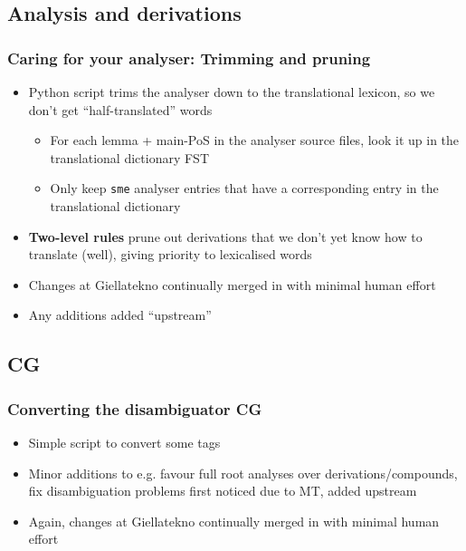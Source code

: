 \documentclass[notes=hide]{beamer}
\newcommand{\sme}{{\tt sme}}
\begin{document}
\subsection{Analysis and derivations}
\begin{frame}\frametitle{Caring for your analyser: Trimming and pruning}
  \begin{itemize}
  \item Python script trims the analyser down to the translational
    lexicon, so we don't get ``half-translated'' words
    \begin{itemize}
    \item For each lemma + main-PoS in the analyser source files, look
      it up in the translational dictionary FST
    \item Only keep \sme{} analyser entries that have a corresponding
      entry in the translational dictionary
    \end{itemize}
  \end{itemize}
  \begin{itemize}
  \item \textbf{Two-level rules} prune out derivations that we don't
    yet know how to translate (well), giving priority to lexicalised
    words
  \end{itemize}
  \begin{itemize}
  \item Changes at Giellatekno continually merged in with minimal
    human effort
  \item Any additions added ``upstream''
  \end{itemize}
\end{frame}

\subsection{CG}
\begin{frame}\frametitle{Converting the disambiguator CG}
  \begin{itemize}
  \item Simple script to convert some tags
  \item Minor additions to e.g. favour full root analyses over
    derivations/compounds, fix disambiguation problems first noticed
    due to MT, added upstream
  \item Again, changes at Giellatekno continually merged in with
    minimal human effort
  \end{itemize}
\end{frame}
\end{document}
